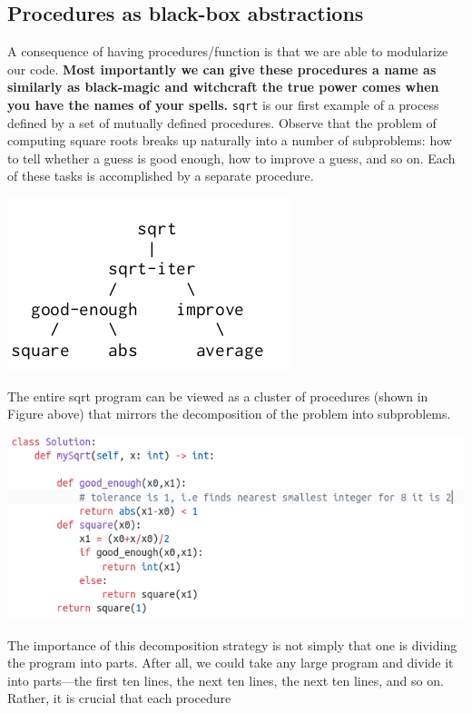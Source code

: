 \documentclass[a4paper,twoside]{article}
\numberwithin{equation}{section}
\begin{document}
\subsection{Procedures as black-box abstractions}
A consequence of having procedures/function is that we are able to modularize our code.
\textbf{Most importantly we can give these procedures a name as similarly as black-magic and
    witchcraft the true power comes when you have the names of your spells.} \texttt{sqrt} is our
first example of a process defined by a set of mutually defined
procedures. Observe that the problem of computing square roots breaks up naturally into a number of
subproblems: how to tell whether a guess is good enough, how to improve a guess, and so on. Each of these tasks is
accomplished by a separate procedure.
\begin{center}
    \includegraphics[scale = 0.5]{assets/sqrt.png}
\end{center}
The entire sqrt program can be viewed as a cluster of procedures (shown in Figure above) that mirrors
the decomposition of the problem into subproblems.
\begin{center}
    \includegraphics[scale = 0.5]{assets/sqrt_example.png}
\end{center}
The importance of this decomposition strategy is not simply that one is dividing the program
into parts. After all, we could take any large program and divide it into parts—the first ten lines,
the next ten lines, the next ten lines, and so on. Rather, it is crucial that each procedure
\end{document}

